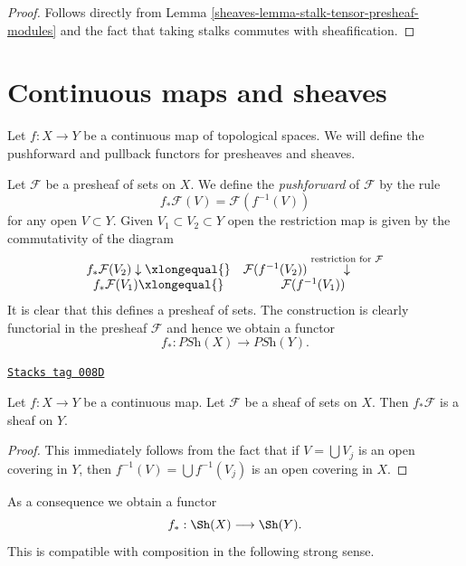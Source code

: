 \begin{proof}

Follows directly from Lemma \ref{sheaves-lemma-stalk-tensor-presheaf-modules}
and the fact that taking stalks commutes with sheafification.
\end{proof}

\section{Continuous maps and sheaves}
\label{sheaves-section-presheaves-functorial}
Let $f : X \to Y$ be a continuous map of topological spaces.
We will define the pushforward and pullback functors for
presheaves and sheaves.

\medskip\noindent
Let $\mathcal{F}$ be a presheaf of sets on $X$. We define the
{\it pushforward} of $\mathcal{F}$ by the rule
$$
f_*\mathcal{F}(V) = \mathcal{F}(f^{-1}(V))
$$
for any open $V \subset Y$.
Given $V_1 \subset V_2 \subset Y$ open the restriction map
is given by the commutativity of the diagram
$$
\begin{array}{cc}f_*\mathcal{F}(V_2) \downarrow\xlongequal{} & \mathcal{F}(f^{-1}(V_2)) \overset{\text{restriction for }\mathcal{F}}{\downarrow} \\ f_*\mathcal{F}(V_1) \xlongequal{} & \mathcal{F}(f^{-1}(V_1))\end{array}
$$
It is clear that this defines a presheaf of sets. The construction
is clearly functorial in the presheaf $\mathcal{F}$ and hence
we obtain a functor
$$
f_* : \textit{PSh}(X) \longrightarrow \textit{PSh}(Y).
$$

\begin{lemma}
\label{sheaves-lemma-pushforward-sheaf}
\href{https://stacks.math.columbia.edu/tag/008D}{\texttt{Stacks tag 008D}}

Let $f : X \to Y$ be a continuous map.
Let $\mathcal{F}$ be a sheaf of sets on $X$.
Then $f_*\mathcal{F}$ is a sheaf on $Y$.
\end{lemma}

\begin{proof}
This immediately follows from the fact that
if $V = \bigcup V_j$ is an open covering in $Y$,
then $f^{-1}(V) = \bigcup f^{-1}(V_j)$ is an open covering in $X$.
\end{proof}

As a consequence we obtain a functor
$$
f_* : \Sh(X) \longrightarrow \Sh(Y).
$$
This is compatible with composition in the following
strong sense.

